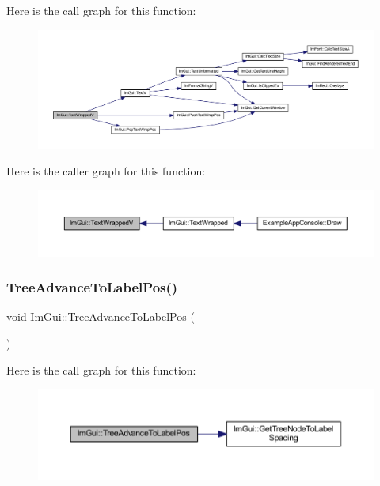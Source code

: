 Here is the call graph for this function\+:
\nopagebreak
\begin{figure}[H]
\begin{center}
\leavevmode
\includegraphics[width=350pt]{namespace_im_gui_a9019a388cd0c410bcb3d3ae63a008123_cgraph}
\end{center}
\end{figure}
Here is the caller graph for this function\+:
\nopagebreak
\begin{figure}[H]
\begin{center}
\leavevmode
\includegraphics[width=350pt]{namespace_im_gui_a9019a388cd0c410bcb3d3ae63a008123_icgraph}
\end{center}
\end{figure}
\mbox{\label{namespace_im_gui_a54e15c2f65cea3aeddd66b5dcfb45716}} 
\subsubsection{\texorpdfstring{Tree\+Advance\+To\+Label\+Pos()}{TreeAdvanceToLabelPos()}}
{\footnotesize\ttfamily void Im\+Gui\+::\+Tree\+Advance\+To\+Label\+Pos (\begin{DoxyParamCaption}{ }\end{DoxyParamCaption})}

Here is the call graph for this function\+:
\nopagebreak
\begin{figure}[H]
\begin{center}
\leavevmode
\includegraphics[width=350pt]{namespace_im_gui_a54e15c2f65cea3aeddd66b5dcfb45716_cgraph}
\end{center}
\end{figure}
\mbox{\label{namespace_im_gui_a4dff507ce8bbe0da9556bb50b1e60d7f}} 
